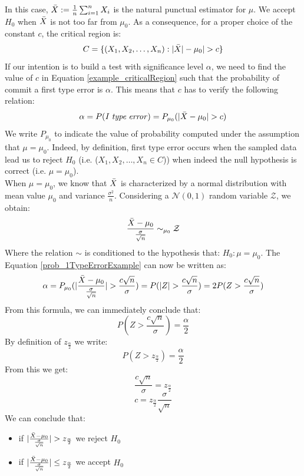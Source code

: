 In this case, $\Bar{X} := \frac{1}{n} \sum_{i=1}^n X_i$ is the natural punctual estimator for $\mu$. We accept $H_0$ when $\Bar{X}$ is not too far from $\mu_0$. As a consequence, for a proper choice of the constant $c$, the critical region is:
\begin{equation}
    \label{example_criticalRegion}
    C = \{(X_1,X_2,\hdots,X_n) : |\Bar{X}|-\mu_0|>c\}
\end{equation}
If our intention is to build a test with significance level $\alpha$, we need to find the value of $c$ in Equation \ref{example_criticalRegion} such that the probability of commit a first type error is $\alpha$. This means that $c$ has to verify the following relation:
\begin{equation}
\label{prob_1TypeErrorExample}
\alpha = P(\mathit{I \; type \; error}) = P_{\mu_0}(|\Bar{X}-\mu_0|>c)
\end{equation}
We write $P_{\mu_0}$ to indicate the value of probability computed under the assumption that $\mu = \mu_0$. Indeed, by definition, first type error occurs when the sampled data lead us to reject $H_0$ (i.e. ($X_1, X_2, \hdots, X_n \in C$)) when indeed the null hypothesis is correct (i.e. $\mu=\mu_0$).\\
When $\mu=\mu_0$, we know that $\Bar{X}$ is characterized by a normal distribution with mean value $\mu_0$ and variance $\frac{\sigma^2}{n}$. Considering a $\mathcal{N}(0,1)$ random variable $\mathcal{Z}$, we obtain:
\begin{equation}
    \frac{\Bar{X}-\mu_0}{\frac{\sigma}{\sqrt{n}}} \sim_{\mu_0} \mathcal{Z}
\end{equation}
Where the relation $\sim$ is conditioned to the hypothesis that: $H_0 : \mu = \mu_0$. The Equation \ref{prob_1TypeErrorExample} can now be written as:
$$\alpha = P_{\mu_0}(|\frac{\Bar{X}-\mu_0}{\frac{\sigma}{\sqrt{n}}}| > \frac{c \sqrt{n}}{\sigma}) = P(|Z| > \frac{c \sqrt{n}}{\sigma}) = 2P(Z > \frac{c \sqrt{n}}{\sigma})$$
From this formula, we can immediately conclude that:
$$P(Z > \frac{c \sqrt{n}}{\sigma}) = \frac{\alpha}{2}$$
By definition of $z_{\frac{\alpha}{2}}$ we write:
$$P(Z > z_\frac{\alpha}{2}) = \frac{\alpha}{2}$$
From this we get:
$$\frac{c \sqrt{n}}{\sigma} = z_{\frac{\alpha}{2}}$$
$$c = z_{\frac{\alpha}{2}}\frac{\sigma}{\sqrt{n}}$$
We can conclude that:
\begin{itemize}
    \item if $|\frac{\Bar{X}-\mu_0}{\frac{\sigma}{\sqrt{n}}}|>z_{\frac{\alpha}{2}}$ we reject $H_0$
    \item if $|\frac{\Bar{X}-\mu_0}{\frac{\sigma}{\sqrt{n}}}| \leq z_{\frac{\alpha}{2}}$ we accept $H_0$
\end{itemize}
